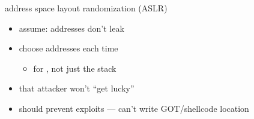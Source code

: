 
\begin{frame}{address space layout randomization (ASLR)}
    \begin{itemize}
    \item assume: addresses don't leak
    \item choose  addresses each time
        \begin{itemize}
        \item for , not just the stack
        \end{itemize}
    \item {} that attacker won't ``get lucky''
    \item should prevent exploits --- can't write GOT/shellcode location
    \end{itemize}
\end{frame}

